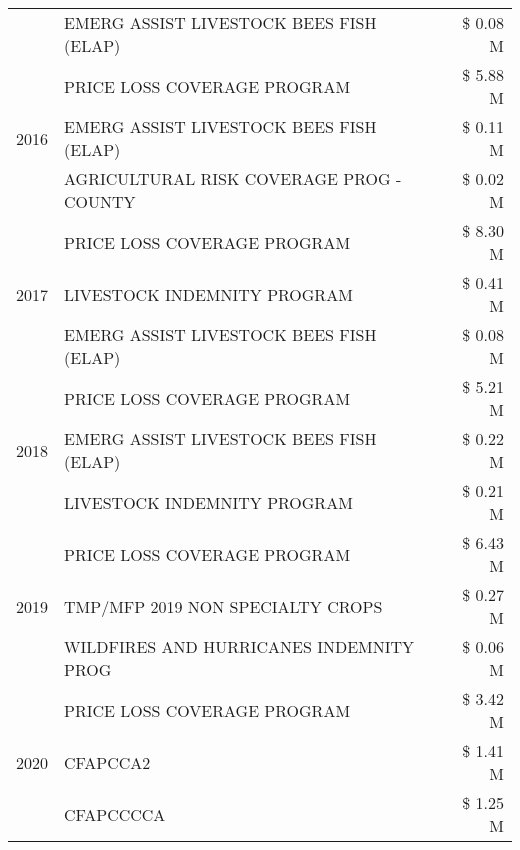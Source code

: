 \begin{tabular}{llr}
 & EMERG ASSIST LIVESTOCK BEES FISH (ELAP) & \$ 0.08 M \\
\cline{1-3}
\multirow[t]{3}{*}{2016} & PRICE LOSS COVERAGE PROGRAM & \$ 5.88 M \\
 & EMERG ASSIST LIVESTOCK BEES FISH (ELAP) & \$ 0.11 M \\
 & AGRICULTURAL RISK COVERAGE PROG - COUNTY & \$ 0.02 M \\
\cline{1-3}
\multirow[t]{3}{*}{2017} & PRICE LOSS COVERAGE PROGRAM & \$ 8.30 M \\
 & LIVESTOCK INDEMNITY PROGRAM & \$ 0.41 M \\
 & EMERG ASSIST LIVESTOCK BEES FISH (ELAP) & \$ 0.08 M \\
\cline{1-3}
\multirow[t]{3}{*}{2018} & PRICE LOSS COVERAGE PROGRAM & \$ 5.21 M \\
 & EMERG ASSIST LIVESTOCK BEES FISH (ELAP) & \$ 0.22 M \\
 & LIVESTOCK INDEMNITY PROGRAM & \$ 0.21 M \\
\cline{1-3}
\multirow[t]{3}{*}{2019} & PRICE LOSS COVERAGE PROGRAM & \$ 6.43 M \\
 & TMP/MFP 2019 NON SPECIALTY CROPS & \$ 0.27 M \\
 & WILDFIRES AND HURRICANES INDEMNITY PROG & \$ 0.06 M \\
\cline{1-3}
\multirow[t]{3}{*}{2020} & PRICE LOSS COVERAGE PROGRAM & \$ 3.42 M \\
 & CFAPCCA2 & \$ 1.41 M \\
 & CFAPCCCCA & \$ 1.25 M \\
\cline{1-3}
\bottomrule
\end{tabular}
